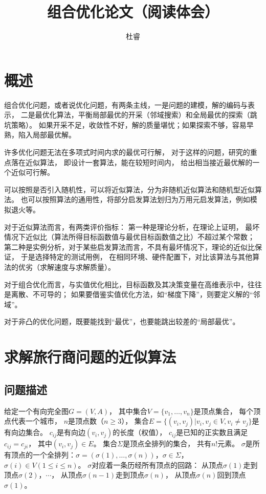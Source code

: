 \documentclass[12pt]{ctexart}
\title{组合优化论文（阅读体会）}
\author{杜睿}
\date{}
\begin{document}
\tableofcontents
\maketitle

\section{概述}
组合优化问题，或者说优化问题，有两条主线，一是问题的建模，解的编码与表示，
二是最优化算法，平衡局部最优的开采（邻域搜索）和全局最优的探索（跳坑策略）。
如果开采不足，收敛性不好，解的质量堪忧；如果探索不够，容易早熟，陷入局部最优解。

许多优化问题无法在多项式时间内求的最优可行解，
对于这样的问题，研究的重点落在近似算法，
即设计一套算法，能在较短时间内，
给出相当接近最优解的一个近似可行解。

可以按照是否引入随机性，可以将近似算法，分为非随机近似算法和随机型近似算法。
也可以按照算法的通用性，将部分启发算法划归为万用元启发算法，例如模拟退火等。

对于近似算法而言，有两类评价指标：
第一种是理论分析，在理论上证明，
最坏情况下近似比（算法所得目标函数值与最优目标函数值之比）不超过某个常数；
第二种是实例分析，对于某些启发算法而言，不具有最坏情况下，理论的近似比保证，
于是选择特定的测试用例，
在相同环境、硬件配置下，对比该算法与其他算法的优劣（求解速度与求解质量）。

对于组合优化而言，与实值优化相比，目标函数及其决策变量在高维表示中，往往是离散、不可导的；
如果要借鉴实值优化方法，如“梯度下降”，则要定义解的“邻域”。

对于非凸的优化问题，既要能找到“最优”，也要能跳出较差的“局部最优”。

\section{求解旅行商问题的近似算法}

\subsection{问题描述}

给定一个有向完全图$G=(V,A)$，
其中集合$V=\{v_1,\dots,v_n\}$是顶点集合，
每个顶点代表一个城市，
$n$是顶点数（$n \ge 3$），
集合$E=\{(v_i,v_j) | v_i,v_j \in V,v_i \ne v_j\}$是有向边集合。
$c_{ij}$是有向边$(v_i,v_j)$的长度（权值），
$c_{ij}$是已知的正实数且满足$c_{ij}=c_{ji}$，
其中$(v_i,v_j)\in E$。
集合$\Sigma$是顶点全排列的集合，
共有$n$!元素。
$\sigma$是所有顶点的一个全排列：$\sigma=(\sigma(1),\dots,\sigma(n))$，$\sigma \in \Sigma$，
$\sigma(i)\in V (1\le i \le n)$。
$\sigma$对应着一条历经所有顶点的回路：
从顶点$\sigma(1)$走到顶点$\sigma(2)$，$\cdots$，
从顶点$\sigma(n-1)$走到顶点$\sigma(n)$，
从顶点$\sigma(n)$回到顶点$\sigma(1)$。
\end{document}
